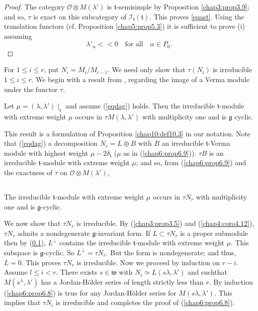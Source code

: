 \begin{proof}
The category $\mathscr{O} \otimes M(\lambda')$ is
$\mathfrak{t}$-semisimple by Proposition \ref{chap3:prop3.9}; and so, $\tau$ is exact
on this subcategory of $\mathscr{I}_\mathfrak{t}(\mathfrak{t})$. This
proves {\ref{eqast}}. Using the translation functors (cf. Proposition
\ref{chap5:prop5.3}) 
it is sufficient to prove (i) assuming 
\begin{equation*}
\lambda'_\alpha << 0 \quad \text{for all} \quad \alpha \in P_0. 
 \tag{$\dagger$}\label{eqdag}
\end{equation*}\pageoriginale
\end{proof}

For $1 \leq i \leq r$, put $N_i = M_i/ M_{i-1}$. We need only show
that $\tau (N_i)$ is irreducible $1 \leq i \leq r$. We begin with a
result from \cite{key15}, regarding the image of a Verma module under
the functor $\tau$. 

\begin{prop}\label{chap6:prop6.9}
Let $\mu = (\lambda, \lambda') \mid_\mathfrak{t}$ and assume
(\ref{eqdag}) holds. Then the irreducible $\mathfrak{t}$-module with
extreme weight $\mu$ occurs in $\tau M(\lambda, \lambda')$ with
multiplicity one and is $\mathfrak{g}$ cyclic. 
\end{prop}


This result is a formulation of Proposition \ref{chap10:def10.3}
\cite{key15} in our 
notation. Note that (\ref{eqdag}) a decomposition $N_r = L \oplus B$
with $B$ an irreducible $\mathfrak{t}$-Verma module with highest
weight $\mu - 2 \delta_\mathfrak{t}$ ($\mu$ as in (\ref{chap6:prop6.9})). $\tau B$ is
an irreducible $\mathfrak{t}$-module with extreme weight $\mu$; and
so, from (\ref{chap6:prop6.9}) and the exactness of $\tau$ on $\mathscr{O} \otimes
M(\lambda')$, 

\setcounter{subsection}{9}
\subsection{}\label{chap6:subsec6.10}
The irreducible $\mathfrak{t}$-module with extreme weight $\mu$ occurs
in $\tau N_r$ with multiplicity one and is $\mathfrak{g}$-cyclic.

We now show that $\tau N_r$ is irreducible. By (\ref{chap3:prop3.5})
and (\ref{chap4:coro4.12}), $\tau 
N_r$ admits  a nondegenerate $\mathfrak{g}$-invariant form. If $L
\subset \tau N_r$ is a proper submodule then by (\ref{chap6:subsec6.10}), $L^\perp$
contains the irreducible $\mathfrak{t}$-module with extreme weight
$\mu$. This subspace is $\mathfrak{g}$-cyclic. So $L^\perp = \tau
N_r$. But the form is nondegenerate; and thus, $L=0$. This proves
$\tau N_r$ is irreducible. Now we proceed by induction on
$r-i$. Assume $l \leq i < r$. There exists $s \in \mathfrak{w}$ with
$N_i \simeq L(s\lambda, \lambda')$ and such\pageoriginale that
$M(s^\lambda, \lambda')$ has a Jordan-H\"older series of length
strictly less than $r$. By induction (\ref{chap6:prop6.8}) is true for any
Jordan-H\"older series for $M(s\lambda, \lambda')$. This implies that
$\tau N_i$ is irreducible and completes the proof of (\ref{chap6:prop6.8}). 

